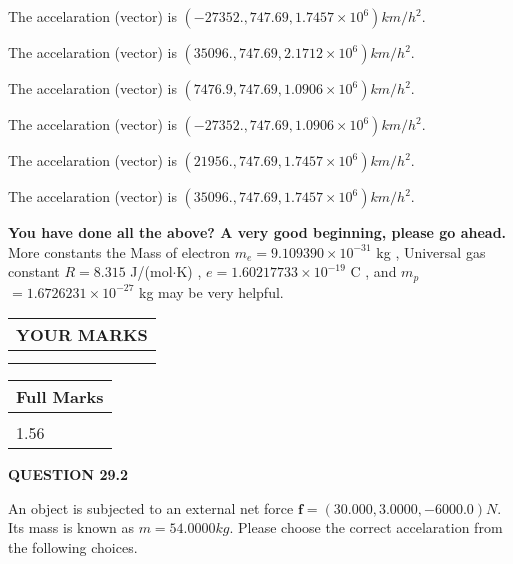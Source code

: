 \documentclass[12pt]{article}
\begin{document}
 
The accelaration (vector) is
$(
-27352.,
747.69 ,
1.7457 \times 10^{6}
)km/h^2.
$
 
 
The accelaration (vector) is
$(
35096.,
747.69 ,
2.1712 \times 10^{6}
)km/h^2.
$
 
 
The accelaration (vector) is
$(
7476.9,
747.69 ,
1.0906 \times 10^{6}
)km/h^2.
$
 
 
The accelaration (vector) is
$(
-27352.,
747.69 ,
1.0906 \times 10^{6}
)km/h^2.
$
 
 
The accelaration (vector) is
$(
21956.,
747.69 ,
1.7457 \times 10^{6}
)km/h^2.
$
 
 
The accelaration (vector) is
$(
35096.,
747.69 ,
1.7457 \times 10^{6}
)km/h^2.
$
 
 
 
 

 
 
\vspace{0.3in}
   
   
\vspace{0.3in}
{\textbf{\LARGE{You have done all the above? A very good beginning, please go ahead.}}}
More constants the
Mass of electron
$m_e$$ =
9.109390 \times 10^{-31} $
kg
,
Universal gas constant
$R$$ =
8.315 $
J/(mol$\cdot $K)
,
$e$$ =
1.60217733 \times 10^{-19} $
C
, and
$m_p$$ =
1.6726231 \times 10^{-27} $
kg
%
may be very helpful.
\vspace{0.3in}
   
   
  
\vspace{0.2in}
  
\noindent\begin{tabular}{|l|}
\hline
 YOUR MARKS  \\
\hline
 \\ 
 \\ 
\hline
\end{tabular}
\hspace{0.05in} \begin{tabular}{|l|}
\hline
 Full Marks  \\
\hline
 \\ 
1.56 \\
\hline
\end{tabular}
{\textbf{\Large{QUESTION
29.2 
}}}
  
  
 
An object is subjected to an external net force $\mathbf{f}=(
30.000 ,
3.0000,
-6000.0  )N$. Its mass is known as
$m= %
54.0000  kg$. Please choose the correct accelaration
from the following choices.
 
\end{document}
